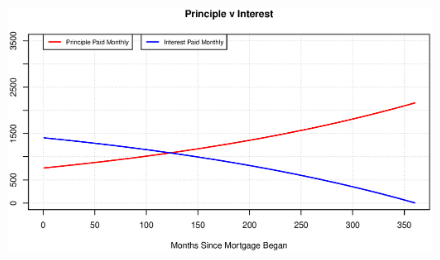 \documentclass[12pt]{article}
\newenvironment{Section}[1]{}{\newpage}
\begin{document}
\begin{Section}{Example B}
\begin{figure}[h!]
			\includegraphics[width = \linewidth]{Figures/PVT.C680.S65.T30}
		\end{figure}
	\end{Section}
\end{document}
